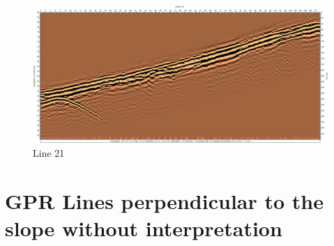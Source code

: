 \begin{figure}[H]
    \centering
    \includegraphics[width=\linewidth]{Images/00_Results/line21.jpg}
    \caption{Line 21}
    \label{fig:line21_}
\end{figure}

\section{GPR Lines perpendicular to the slope without interpretation}